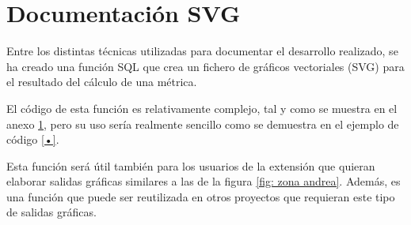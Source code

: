 \chapter{Documentación SVG}\label{anex:svg}

Entre los distintas técnicas utilizadas para documentar el desarrollo realizado, se ha creado una función SQL que crea un fichero de gráficos vectoriales (SVG) para el resultado del cálculo de una métrica. 

El código de esta función es relativamente complejo, tal y como se muestra en el anexo \ref{anex:svg}, pero su uso sería realmente sencillo como se demuestra en el ejemplo de código \ref{•}.

Esta función será útil también para los usuarios de la extensión que quieran elaborar salidas gráficas similares a las de la figura \ref{fig: zona andrea}. Además, es una función que puede ser reutilizada en otros proyectos que requieran este tipo de salidas gráficas.

